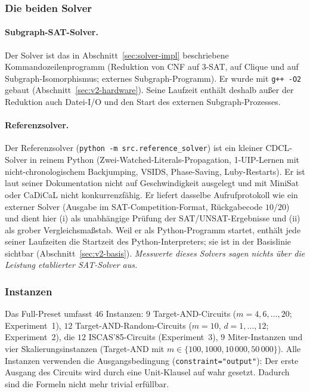 \documentclass[a4paper,12pt]{article}
\theoremstyle{definition}
\begin{document}
\subsubsection{Die beiden Solver}
\label{sec:v2-solver}

\paragraph{Subgraph-SAT-Solver.} Der Solver ist das in Abschnitt~\ref{sec:solver-impl} beschriebene Kommandozeilenprogramm (Reduktion von CNF auf 3-SAT, auf Clique und auf Subgraph-Isomorphismus; externes Subgraph-Programm). Er wurde mit \texttt{g++ -O2} gebaut (Abschnitt~\ref{sec:v2-hardware}). Seine Laufzeit enthält deshalb außer der Reduktion auch Datei-I/O und den Start des externen Subgraph-Prozesses.

\paragraph{Referenzsolver.} Der Referenzsolver (\texttt{python -m src.reference\_solver}) ist ein kleiner CDCL-Solver in reinem Python (Zwei-Watched-Literals-Propagation, 1-UIP-Lernen mit nicht-chronologischem Backjumping, VSIDS, Phase-Saving, Luby-Restarts). Er ist laut seiner Dokumentation nicht auf Geschwindigkeit ausgelegt und mit MiniSat oder CaDiCaL nicht konkurrenzfähig. Er liefert dasselbe Aufrufprotokoll wie ein externer Solver (Ausgabe im SAT-Competition-Format, Rückgabecode $10$/$20$) und dient hier (i) als unabhängige Prüfung der SAT/UNSAT-Ergebnisse und (ii) als grober Vergleichsmaßstab. Weil er als Python-Programm startet, enthält jede seiner Laufzeiten die Startzeit des Python-Interpreters; sie ist in der Basislinie sichtbar (Abschnitt~\ref{sec:v2-basis}). \emph{Messwerte dieses Solvers sagen nichts über die Leistung etablierter SAT-Solver aus.}

\subsubsection{Instanzen}
\label{sec:v2-instanzen}

Das Full-Preset umfasst $46$ Instanzen: $9$ Target-AND-Circuits ($m=4,6,\ldots,20$; Experiment~1), $12$ Target-AND-Random-Circuits ($m=10$, $d=1,\ldots,12$; Experiment~2), die $12$ ISCAS'85-Circuits (Experiment~3), $9$ Miter-Instanzen und vier Skalierungsinstanzen (Target-AND mit $m \in \{100, 1000, 10\,000, 50\,000\}$). Alle Instanzen verwenden die Ausgangsbedingung (\texttt{constraint="output"}): Der erste Ausgang des Circuits wird durch eine Unit-Klausel auf wahr gesetzt. Dadurch sind die Formeln nicht mehr trivial erfüllbar.
\end{document}
